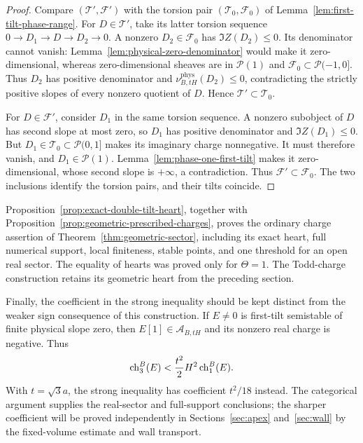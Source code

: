 \begin{proof}
Compare $(\mathcal T',\mathcal F')$ with the torsion pair
$(\mathcal T_0,\mathcal F_0)$ of
Lemma~\ref{lem:first-tilt-phase-range}.
For $D\in\mathcal T'$, take its latter torsion sequence
$0\to D_1\to D\to D_2\to0$.
A nonzero $D_2\in\mathcal F_0$ has $\Im Z(D_2)\le0$.
Its denominator cannot vanish: Lemma~\ref{lem:physical-zero-denominator}
would make it zero-dimensional, whereas zero-dimensional sheaves are in
$\mathcal P(1)$ and $\mathcal F_0\subset\mathcal P(-1,0]$.
Thus $D_2$ has positive denominator and
$\nu^{\mathrm{phys}}_{B,tH}(D_2)\le0$, contradicting the strictly positive
slopes of every nonzero quotient of $D$.  Hence
$\mathcal T'\subset\mathcal T_0$.

For $D\in\mathcal F'$, consider $D_1$ in the same torsion sequence.
A nonzero subobject of $D$ has second slope at most zero, so $D_1$ has
positive denominator and $\Im Z(D_1)\le0$.
But $D_1\in\mathcal T_0\subset\mathcal P(0,1]$ makes its imaginary
charge nonnegative.  It must therefore vanish, and $D_1\in\mathcal P(1)$.
Lemma~\ref{lem:phase-one-first-tilt} makes it zero-dimensional, whose second
slope is $+\infty$, a contradiction.  Thus
$\mathcal F'\subset\mathcal F_0$.
The two inclusions identify the torsion pairs, and their tilts coincide.
\end{proof}

Proposition~\ref{prop:exact-double-tilt-heart}, together with
Proposition~\ref{prop:geometric-prescribed-charges}, proves the ordinary
charge assertion of Theorem~\ref{thm:geometric-sector}, including its exact
heart, full numerical support, local finiteness, stable points, and one
threshold for an open real sector.  The equality of hearts was proved only
for $\Theta=1$.  The Todd-charge construction retains its geometric heart
from the preceding section.

Finally, the coefficient in the strong inequality should be kept distinct
from the weaker sign consequence of this construction.  If $E\ne0$ is
first-tilt semistable of finite physical slope zero, then
$E[1]\in\mathcal A_{B,tH}$ and its nonzero real charge is negative.  Thus
\[
 \operatorname{ch}_3^B(E)<\frac{t^2}{2}H^2\operatorname{ch}_1^B(E).
\]
With $t=\sqrt3a$, the strong inequality has coefficient $t^2/18$ instead.
The categorical argument supplies the real-sector and full-support
conclusions; the sharper coefficient will be proved independently in
Sections~\ref{sec:apex} and~\ref{sec:wall} by the fixed-volume estimate
and wall transport.

